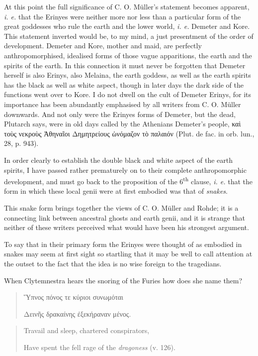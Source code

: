 \documentclass[a4paper, 11pt, oneside, polutonikogreek, english]{article}
\begin{document}
At this point the full significance of C. O. Müller's statement becomes apparent, \emph{i. e.} that the Erinyes were neither more nor less than a particular form of the great goddesses who rule the earth and the lower world, \emph{i. e.} Demeter and Kore. This statement inverted would be, to my mind, a just presentment of the order of development. Demeter and Kore, mother and maid, are perfectly anthropomorphised, idealised forms of those vague apparitions, the earth and the spirits of the earth. In this connection it must never be forgotten that Demeter herself is also Erinys, also Melaina, the earth goddess, as well as the earth spirits has the black as well as white aspect, though in later days the dark side of the functions went over to Kore. I do not dwell on the cult of Demeter Erinys, for its importance has been abundantly emphasised by all writers from C. O. Müller downwards. And not only were the Erinyes forms of Demeter, but the dead, Plutarch says, were in old days called by the Athenians Demeter's people, καὶ τοὺς νεκροὺς Ἀθηναῖοι Δημητρείους ὠνόμαζον τὸ παλαιόν (Plut. de fac. in orb. lun., 28, p. 943).

In order clearly to establish the double black and white aspect of the earth spirits, I have passed rather prematurely on to their complete anthropomorphic development, and must go back to the proposition of the 6\textsuperscript{th} clause, \emph{i. e.} that the form in which these local genii were at first embodied was that of \emph{snakes}.

This snake form brings together the views of C. O. Müller and Rohde; it is a connecting link between ancestral ghosts and earth genii, and it is strange that neither of these writers perceived what would have been his strongest argument.

To say that in their primary form the Erinyes were thought of as embodied in snakes may seem at first sight so startling that it may be well to call attention at the outset to the fact that the idea is no wise foreign to the tragedians.

When Clytemnestra hears the snoring of the Furies how does she name them?
\begin{quotation}
\large
Ὕπνος πόνος τε κύριοι συνωμόται

Δεινῆς δρακαίνης ἐξεκήραναν μένος.
\end{quotation}
\begin{quotation}
\large
Travail and sleep, chartered conspirators,

Have spent the fell rage of the \emph{dragoness} (v. 126).
\end{quotation}
\end{document}

